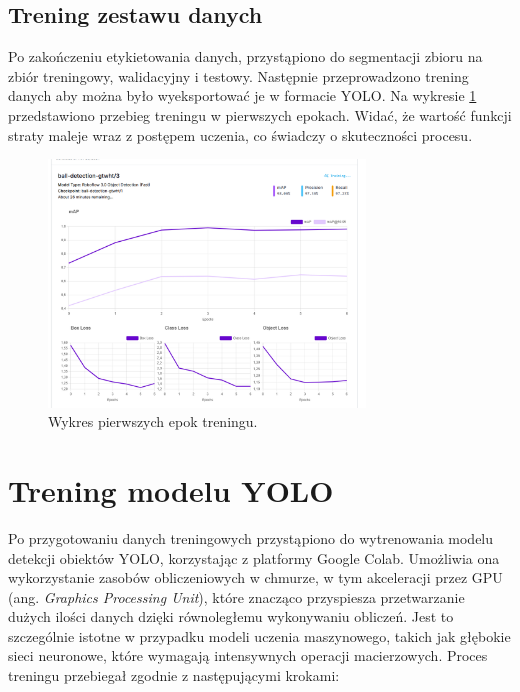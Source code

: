 \documentclass[a4paper,twoside,12pt]{book}
\begin{document}
\newpage

\subsection{Trening zestawu danych}
Po zakończeniu etykietowania danych, przystąpiono do segmentacji zbioru na zbiór treningowy, walidacyjny i testowy.
Następnie przeprowadzono trening danych aby można było wyeksportować je w formacie YOLO.
Na wykresie \ref{fig:Wykrespoczatek} przedstawiono przebieg treningu w pierwszych epokach. Widać, że wartość funkcji straty maleje wraz z postępem uczenia, co świadczy o skuteczności procesu.

\begin{figure}[h]
    \centering
    \includegraphics[width=0.75\textwidth]{Images/Roboflow/poczatek uczenia.png}
    \caption{Wykres pierwszych epok treningu.}
    \label{fig:Wykrespoczatek}
\end{figure}

\newpage

\section{Trening modelu YOLO}

Po przygotowaniu danych treningowych przystąpiono do wytrenowania modelu detekcji obiektów YOLO, korzystając z platformy Google Colab. Umożliwia ona wykorzystanie zasobów obliczeniowych w chmurze, w tym akceleracji przez GPU (ang. \textit{Graphics Processing Unit}), które znacząco przyspiesza przetwarzanie dużych ilości danych dzięki równoległemu wykonywaniu obliczeń. Jest to szczególnie istotne w przypadku modeli uczenia maszynowego, takich jak głębokie sieci neuronowe, które wymagają intensywnych operacji macierzowych. Proces treningu przebiegał zgodnie z następującymi krokami:
\end{document}

